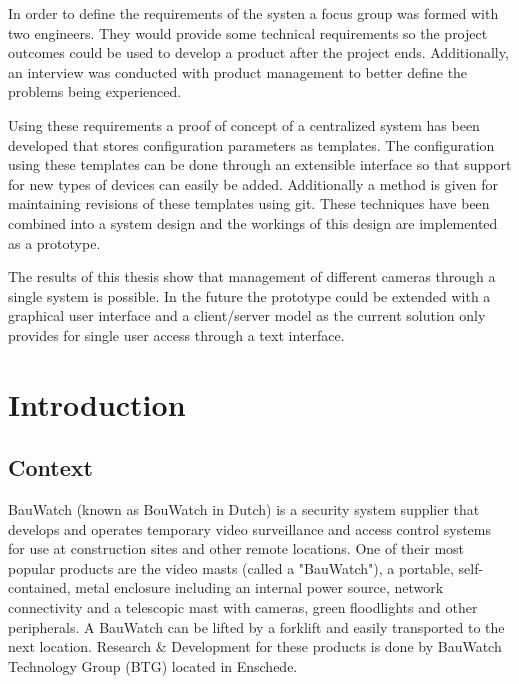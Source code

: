 In order to define the requirements of the systen a focus group was formed with two engineers.
They would provide some technical requirements so the project outcomes could be used to develop a product after the project ends.
Additionally, an interview was conducted with product management to better define the problems being experienced.

Using these requirements a proof of concept of a centralized system has been developed that stores configuration parameters as templates.
The configuration using these templates can be done through an extensible interface so that support for new types of devices can easily be added.
Additionally a method is given for maintaining revisions of these templates using git.
These techniques have been combined into a system design and the workings of this design are implemented as a prototype.

The results of this thesis show that management of different cameras through a single system is possible.
In the future the prototype could be extended with a graphical user interface and a client/server model as the current solution only provides for single user access through a text interface.
\thispagestyle{empty}

\thispagestyle{empty}
\tableofcontents
\thispagestyle{empty}

\chapter{Introduction}

\section{Context}
BauWatch (known as BouWatch in Dutch) is a security system supplier that develops and operates temporary video surveillance and access control systems for use at construction sites and other remote locations.
One of their most popular products are the video masts (called a "BauWatch"), a portable, self-contained, metal enclosure including an internal
power source, network connectivity and a telescopic mast with cameras, green floodlights and other peripherals. A BauWatch can be lifted by a forklift and
easily transported to the next location. Research \& Development for these products is done by BauWatch Technology Group (BTG) located in Enschede.

